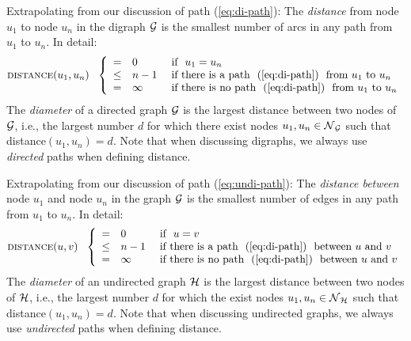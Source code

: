 Extrapolating from our discussion of path (\ref{eq:di-path}): The {\it
  distance} from node $u_1$ to node $u_n$ in the digraph $\mbox{$\cal G$}$ is the
smallest number of arcs in any path from $u_1$ to $u_n$.  In detail:
\begin{equation}
\label{eq:di-distance-defn}
 \mbox{\sc distance}(u_1, u_n) \ \ \left\{
\begin{array}{cll}
= & 0 & \mbox{  if  } \ u_1 = u_n \\
\leq & n-1 & \mbox{  if there is a path } \ (\ref{eq:di-path})
\ \mbox{ from $u_1$ to $u_n$} \\
= & \infty & \mbox{  if there is no path } \ (\ref{eq:di-path})
\ \mbox{ from $u_1$ to $u_n$}
\end{array}
\right.
\end{equation}
The {\it diameter} 
 of a directed graph $\mbox{$\cal G$}$ is the largest
distance between two nodes of $\mbox{$\cal G$}$, i.e., the largest number $d$ for
which there exist nodes $u_1, u_n \in \mbox{$\cal N$}_{\mbox{{\scriptsize $\cal G$}}}$ such that {\sc
  distance}$(u_1, u_n) = d$.  Note that when discussing digraphs, we
always use {\em directed} paths when defining distance.

\medskip

Extrapolating from our discussion of path (\ref{eq:undi-path}): The
{\it distance between} node $u_1$ and node $u_n$ in the graph $\mbox{$\cal G$}$ is
the smallest number of edges in any path from $u_1$ to $u_n$.  In
detail:
\begin{equation}
\label{eq:distance-defn}
 \mbox{\sc distance}(u, v) \ \ \left\{
\begin{array}{cll}
= & 0 & \mbox{  if  } \ u = v \\
\leq & n-1 & \mbox{  if there is a path } \ (\ref{eq:di-path})
\ \mbox{ between $u$ and $v$} \\
= & \infty & \mbox{  if there is no path } \ (\ref{eq:di-path})
\ \mbox{ between $u$ and $v$}
\end{array}
\right.
\end{equation}
The {\it diameter}  
of an undirected graph $\mbox{$\cal H$}$ is the largest distance between two nodes
of $\mbox{$\cal H$}$, i.e., the largest number $d$ for which the exist nodes $u_1,
u_n \in \mbox{$\cal N$}_{\mbox{{\scriptsize $\cal H$}}}$ such that {\sc distance}$(u_1, u_n) = d$.  Note that
when discussing undirected graphs, we always use {\em undirected}
paths when defining distance.


